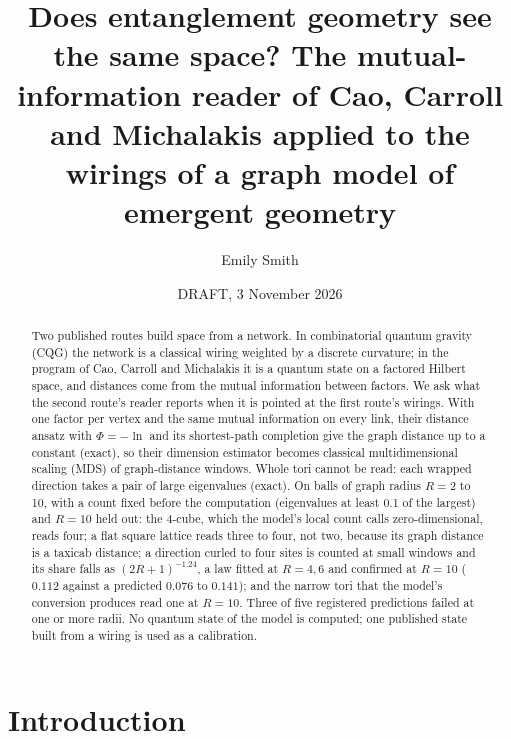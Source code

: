 \documentclass[aps,pre,10pt,twocolumn,superscriptaddress,nofootinbib]{revtex4-2}
\begin{document}
\title{Does entanglement geometry see the same space? The mutual-information reader of Cao, Carroll and
Michalakis applied to the wirings of a graph model of emergent geometry}

\author{Emily Smith}

\date{DRAFT, 3 November 2026}

\begin{abstract}
Two published routes build space from a network. In combinatorial quantum gravity (CQG) the network is a classical
wiring weighted by a discrete curvature; in the program of Cao, Carroll and Michalakis it is a quantum state on a
factored Hilbert space, and distances come from the mutual information between factors. We ask what the second
route's reader reports when it is pointed at the first route's wirings. With one factor per vertex and the same
mutual information on every link, their distance ansatz with $\Phi=-\ln$ and its shortest-path completion give the
graph distance up to a constant (exact), so their dimension estimator becomes classical multidimensional scaling
(MDS) of graph-distance windows. Whole tori cannot be read: each wrapped direction takes a pair of large
eigenvalues (exact). On balls of graph radius $R=2$ to 10, with a count fixed before the computation (eigenvalues at
least 0.1 of the largest) and $R=10$ held out: the 4-cube, which the model's local count calls zero-dimensional,
reads four; a flat square lattice reads three to four, not two, because its graph distance is a taxicab distance; a
direction curled to four sites is counted at small windows and its share falls as $(2R+1)^{-1.24}$, a law fitted at
$R=4,6$ and confirmed at $R=10$ ($0.112$ against a predicted $0.076$ to $0.141$); and the narrow tori that the
model's conversion produces read one at $R=10$. Three of five registered predictions failed at one or more radii.
No quantum state of the model is computed; one published state built from a wiring is used as a calibration.
\end{abstract}

\maketitle

\section{Introduction}
\end{document}
